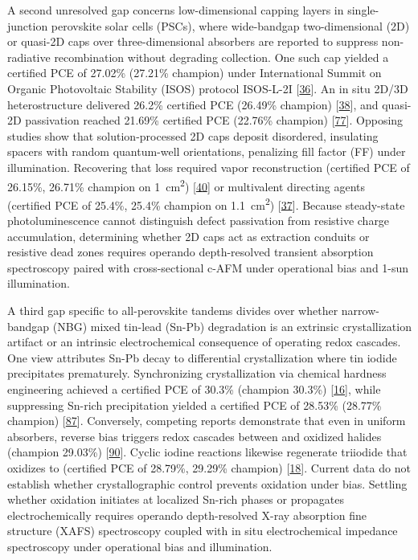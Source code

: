 \documentclass[
  11pt,
]{article}
\begin{document}
A second unresolved gap concerns low-dimensional capping layers in
single-junction perovskite solar cells (PSCs), where wide-bandgap
two-dimensional (2D) or quasi-2D caps over three-dimensional absorbers
are reported to suppress non-radiative recombination without degrading
collection. One such cap yielded a certified PCE of 27.02\% (27.21\%
champion) under International Summit on Organic Photovoltaic Stability
(ISOS) protocol ISOS-L-2I
{[}\href{https://doi.org/10.1038/s41467-026-71845-7}{36}{]}. An in situ
2D/3D heterostructure delivered 26.2\% certified PCE (26.49\% champion)
{[}\href{https://doi.org/10.1002/anie.8890696}{38}{]}, and quasi-2D
passivation reached 21.69\% certified PCE (22.76\% champion)
{[}\href{https://doi.org/10.1002/adma.72756}{77}{]}. Opposing studies
show that solution-processed 2D caps deposit disordered, insulating
spacers with random quantum-well orientations, penalizing fill factor
(FF) under illumination. Recovering that loss required vapor
reconstruction (certified PCE of 26.15\%, 26.71\% champion on
\qty{1}{\centi\meter\squared})
{[}\href{https://doi.org/10.1038/s41467-026-72790-1}{40}{]} or
multivalent directing agents (certified PCE of 25.4\%, 25.4\% champion
on \qty{1.1}{\centi\meter\squared})
{[}\href{https://doi.org/10.1126/science.aea0656}{37}{]}. Because
steady-state photoluminescence cannot distinguish defect passivation
from resistive charge accumulation, determining whether 2D caps act as
extraction conduits or resistive dead zones requires operando
depth-resolved transient absorption spectroscopy paired with
cross-sectional c-AFM under operational bias and 1-sun illumination.

A third gap specific to all-perovskite tandems divides over whether
narrow-bandgap (NBG) mixed tin-lead (Sn-Pb) degradation is an extrinsic
crystallization artifact or an intrinsic electrochemical consequence of
operating redox cascades. One view attributes Sn-Pb decay to
differential crystallization where tin iodide precipitates prematurely.
Synchronizing crystallization via chemical hardness engineering achieved
a certified PCE of 30.3\% (champion 30.3\%)
{[}\href{https://doi.org/10.1038/s41565-026-02165-6}{16}{]}, while
suppressing Sn-rich precipitation yielded a certified PCE of 28.53\%
(28.77\% champion)
{[}\href{https://doi.org/10.1021/acsenergylett.6c00617}{87}{]}.
Conversely, competing reports demonstrate that even in uniform
absorbers, reverse bias triggers redox cascades between  and
oxidized halides (champion 29.03\%)
{[}\href{https://doi.org/10.1002/adma.202522942}{90}{]}. Cyclic iodine
reactions likewise regenerate triiodide that oxidizes  to
 (certified PCE of 28.79\%, 29.29\% champion)
{[}\href{https://doi.org/10.1002/anie.4918900}{18}{]}. Current data do
not establish whether crystallographic control prevents 
oxidation under bias. Settling whether oxidation initiates at localized
Sn-rich phases or propagates electrochemically requires operando
depth-resolved X-ray absorption fine structure (XAFS) spectroscopy
coupled with in situ electrochemical impedance spectroscopy under
operational bias and illumination.
\end{document}
